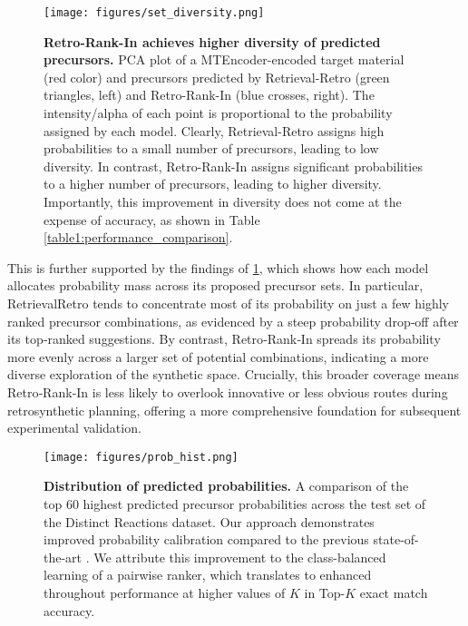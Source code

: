 \begin{figure}%
    \centering
        \centering
        \texttt{[image: figures/set\_diversity.png]}
        \caption{\textbf{Retro-Rank-In achieves higher diversity of predicted precursors.} PCA plot of a MTEncoder-encoded target material (red color) and precursors predicted by Retrieval-Retro (green triangles, left) and Retro-Rank-In (blue crosses, right). The intensity/alpha of each point is proportional to the probability assigned by each model. Clearly, Retrieval-Retro assigns high probabilities to a small number of precursors, leading to low diversity. In contrast, Retro-Rank-In assigns significant probabilities to a higher number of precursors, leading to higher diversity. Importantly, this improvement in diversity does not come at the expense of accuracy, as shown in Table \ref{table1:performance_comparison}.
        }
        \label{fig:plot9}
\end{figure}

This is further supported by the findings of \cref{fig:plot9}, which shows how each model allocates probability mass across its proposed precursor sets. In particular, RetrievalRetro tends to concentrate most of its probability on just a few highly ranked precursor combinations, as evidenced by a steep probability drop‐off after its top‐ranked suggestions. By contrast, Retro‐Rank‐In spreads its probability more evenly across a larger set of potential combinations, indicating a more diverse exploration of the synthetic space. Crucially, this broader coverage means Retro‐Rank‐In is less likely to overlook innovative or less obvious routes during retrosynthetic planning, offering a more comprehensive foundation for subsequent experimental validation.

\begin{figure}[htb!]
    \centering
        \centering
        \texttt{[image: figures/prob\_hist.png]}
        \caption{\textbf{Distribution of predicted probabilities.} A comparison of the top 60 highest predicted precursor probabilities across the test set of the Distinct Reactions dataset. Our approach demonstrates improved probability calibration compared to the previous state-of-the-art \citep{noh2024retrieval}. We attribute this improvement to the class-balanced learning of a pairwise ranker, which translates to enhanced throughout performance at higher values of $K$ in Top-$K$ exact match accuracy.}
        \label{fig:rr_ours_prob_dist}
\end{figure}

